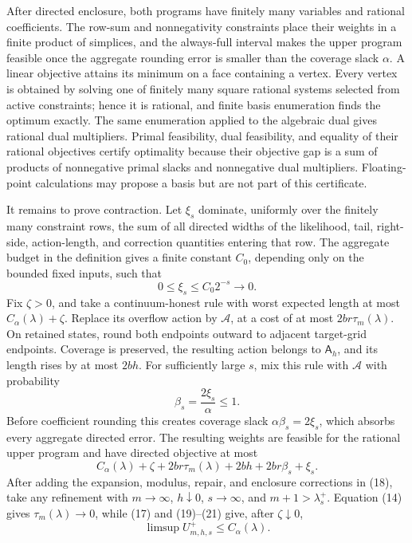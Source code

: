 After directed enclosure, both programs have finitely many variables
and rational coefficients.  The row-sum and nonnegativity constraints
place their weights in a finite product of simplices, and the
always-full interval makes the upper program feasible once the
aggregate rounding error is smaller than the coverage slack
\(\alpha\).  A linear objective attains its minimum on a face
containing a vertex.  Every vertex is obtained by solving one of
finitely many square rational systems selected from active constraints;
hence it is rational, and finite basis enumeration finds the optimum
exactly.  The same enumeration applied to the algebraic dual gives
rational dual multipliers.  Primal feasibility, dual feasibility, and
equality of their rational objectives certify optimality because their
objective gap is a sum of products of nonnegative primal slacks and
nonnegative dual multipliers.  Floating-point calculations may propose
a basis but are not part of this certificate.

It remains to prove contraction.  Let \(\xi_s\) dominate, uniformly
over the finitely many constraint rows, the sum of all directed widths
of the likelihood, tail, right-side, action-length, and correction
quantities entering that row.  The aggregate budget in the definition
gives a finite constant \(C_0\), depending only on the bounded fixed
inputs, such that
\[
 0\le\xi_s\le C_0 2^{-s}\longrightarrow0.
 \tag{19}
\]
Fix \(\zeta>0\), and take a continuum-honest rule with worst expected
length at most \(C_\alpha(\lambda)+\zeta\).  Replace its overflow
action by \(\mathcal A\), at a cost of at most
\(2br\tau_m(\lambda)\).  On retained states, round both endpoints
outward to adjacent target-grid endpoints.  Coverage is preserved, the
resulting action belongs to \(\mathsf A_h\), and its length rises by at
most \(2bh\).  For sufficiently large \(s\), mix this rule with
\(\mathcal A\) with probability
\[
 \beta_s=\frac{2\xi_s}{\alpha}\le1.
 \tag{20}
\]
Before coefficient rounding this creates coverage slack
\(\alpha\beta_s=2\xi_s\), which absorbs every aggregate directed error.
The resulting weights are feasible for the rational upper program and
have directed objective at most
\[
 C_\alpha(\lambda)+\zeta+2br\tau_m(\lambda)+2bh
 +2br\beta_s+\xi_s.
 \tag{21}
\]
After adding the expansion, modulus, repair, and enclosure corrections
in (18), take any refinement with \(m\to\infty\), \(h\downarrow0\),
\(s\to\infty\), and \(m+1>\lambda_s^+\).  Equation (14) gives
\(\tau_m(\lambda)\to0\), while (17) and (19)--(21) give, after
\(\zeta\downarrow0\),
\[
 \limsup U_{m,h,s}^+\le C_\alpha(\lambda).
 \tag{22}
\]

